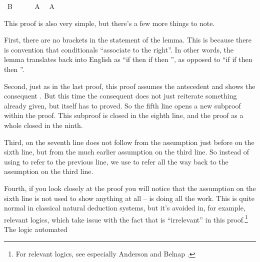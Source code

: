 \begin{isabellebody}
\ {\isachardoublequoteopen}B{\isachardoublequoteclose}\isanewline
\ \ \ \ \isamarkupfalse%
\ {\isacharbackquoteopen}A{\isacharbackquoteclose}\ \isamarkupfalse%
\ {\isachardoublequoteopen}A{\isachardoublequoteclose}\isacommand{{\isachardot}}\isamarkupfalse%
\isanewline
\ \ \isamarkupfalse%
\isanewline
{}\isamarkupfalse%
%
\endisatagproof
{\isafoldproof}%
%
\isadelimproof
%
\endisadelimproof
%
\begin{isamarkuptext}%
This proof is also very simple, but there's a few more things to note.%
\end{isamarkuptext}\isamarkuptrue%
%
\begin{isamarkuptext}%
First, there are no brackets in the statement of the lemma. This is because there is 
convention that conditionals ``associate to the right''. In other words, the lemma translates back
into English as ``if  then if   then  '', as opposed to ``if if
  then  then ''.%
\end{isamarkuptext}\isamarkuptrue%
%
\begin{isamarkuptext}%
Second, just as in the last proof, this proof assumes the antecedent  and shows
the consequent . But this time the consequent does not just reiterate something
already given, but itself has to proved. So the fifth line opens a new subproof within the proof. 
This subproof is closed in the eighth line, and the proof as a whole closed in the ninth.%
\end{isamarkuptext}\isamarkuptrue%
%
\begin{isamarkuptext}%
Third, on the seventh line   does not follow from the assumption just before on
the sixth line, but from the much earlier assumption on the third line. So instead of using 
to refer to the previous line, we use  to refer all the way back to the assumption
on the third line.%
\end{isamarkuptext}\isamarkuptrue%
%
\begin{isamarkuptext}%
Fourth, if you look closely at the proof you will notice that the assumption  on
the sixth line is not used to show anything at all --  is doing all the work. This is quite
normal in classical natural deduction systems, but it's avoided in, for example, relevant logics,
which take issue with the fact that  is ``irrelevant'' in this proof.\footnote{For relevant
logics, see especially Anderson and Belnap \cite{anderson_entailment_1976}.} The logic automated 

\end{isamarkuptext}
\end{isabellebody}
